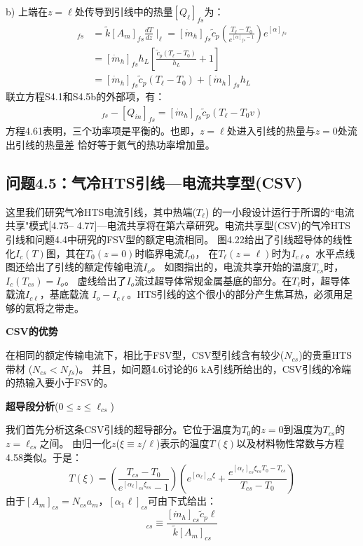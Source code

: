 b) 上端在$z=\ell$处传导到引线中的热量$[Q_{\ell}]_{fs}$为：
\begin{align*}
[Q_\ell]_{fs}&=\tilde{k}[A_m]_{fs}\frac{dT}{dz}\mid_\ell=[\dot{m}_h]_{fs}\tilde{c}_p(\frac{T_\ell-T_0}{e^{[\alpha]_{fs}-1}})e^{[\alpha]_{fs}}\\ \tag{S4.5a}
&=[\dot{m}_h]_{fs}h_L\left[\frac{\tilde{c}_p(T_\ell-T_0)}{h_L}+1\right]\\
&=[\dot{m}_h]_{fs}\tilde{c}_p(T_\ell-T_0)+[\dot{m}_h]_{fs}h_L\tag{S4.5b}
\end{align*}
联立方程S4.1和S4.5b的外部项，有：
\begin{align*}%
[Q_\ell]_{fs}-[Q_{in}]_{fs}=[\dot{m}_h]_{fs}\tilde{c}_p(T_\ell-T_0v)\tag{4.61}
\end{align*}
方程4.61表明，三个功率项是平衡的。也即，$z=\ell$处进入引线的热量与$z=0$处流出引线的热量差
恰好等于氦气的热功率增加量。

\subsection{问题4.5：气冷HTS引线---电流共享型(CSV)}

这里我们研究气冷HTS电流引线，其中热端($T_\ell$) 的一小段设计运行于所谓的``电流共享"模式[4.75–
4.77]---电流共享将在第六章研究。电流共享型(CSV)的气冷HTS引线和问题4.4中研究的FSV型的额定电流相同。
图4.22给出了引线超导体的线性化$I_c(T)$图，其在$T_0 (z = 0)$时临界电流$I_{c0}$，
在$T_\ell(z=\ell)$时为$I_{c\ell}$。水平点线图还给出了引线的额定传输电流$I_o$。
如图指出的，电流共享开始的温度$T_{cs}$时，$I_c(T_{cs})=I_o$。
虚线给出了$I_o$流过超导体常规金属基底的部分。在$T_\ell$时，超导体载流$I_{c\ell}$，基底载流
$I_o-I_{c\ell}$。HTS引线的这个很小的部分产生焦耳热，必须用足够的氦将之带走。

\textbf{CSV的优势}

在相同的额定传输电流下，相比于FSV型，CSV型引线含有较少($N_{cs}$)的贵重HTS带材 ($N_{cs} <N_{fs}$)。
并且，如问题4.6讨论的6 kA引线所给出的，CSV引线的冷端的热输入要小于FSV的。

\textbf{超导段分析}($0\le z\le \ell_{cs}$)

我们首先分析这条CSV引线的超导部分。它位于温度为$T_0$的$z = 0$到温度为$T_{cs}$的$z =\ell_{cs}$之间。
由归一化$z$($\xi\equiv z/\ell$)表示的温度$T(\xi)$以及材料物性常数与方程4.58类似。于是：
\begin{equation}%
T(\xi)=(\frac{T_{cs}-T_0}{e^{[\alpha_\ell]_{cs}\xi_{cs}}-1})(e^{[\alpha_\ell]_{cs}\xi}+\frac{e^{[\alpha_\ell]_{cs}\xi_{cs}T_0-T_{cs}}}{T_{cs}-T_0})
\end{equation}
由于$[A_m]_{cs}=N_{cs}a_m$，$[\alpha_{1}\ell]_{cs}$可由下式给出：
\begin{equation}%
[\alpha_\ell]_{cs}\equiv\frac{[\dot{m}_h]_{cs}\tilde{c}_p\ell}{\tilde{k}[A_m]_{cs}}
\end{equation}

